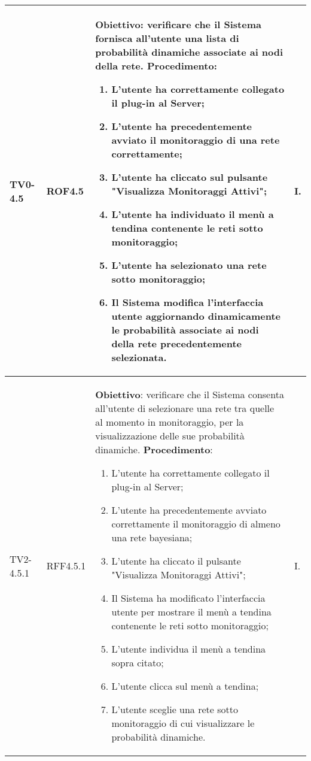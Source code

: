 \begin{longtable}{|C{.15\textwidth}|C{.13\textwidth}|m{.52\textwidth}|C{.08\textwidth}|}
TV0-4.5 & ROF4.5 &
	\textbf{Obiettivo}: verificare che il Sistema fornisca all'utente una lista di probabilità dinamiche associate ai nodi della rete. \newline
	\textbf{Procedimento}:
	\begin{enumerate}	
		\item L'utente ha correttamente collegato il plug-in al Server;
		\item L'utente ha precedentemente avviato il monitoraggio di una rete correttamente;
		\item L'utente ha cliccato sul pulsante "Visualizza Monitoraggi Attivi";
		\item L'utente ha individuato il menù a tendina contenente le reti sotto monitoraggio;
		\item L'utente ha selezionato una rete sotto monitoraggio;
		\item Il Sistema modifica l'interfaccia utente aggiornando dinamicamente le probabilità associate ai nodi della rete precedentemente selezionata.
	\end{enumerate}
	& I. \\
\hline

TV2-4.5.1 & RFF4.5.1 &
	\textbf{Obiettivo}: verificare che il Sistema consenta all'utente di selezionare una rete tra quelle al momento in monitoraggio, per la visualizzazione delle sue probabilità dinamiche. \newline
	\textbf{Procedimento}:
	\begin{enumerate}
		\item L'utente ha correttamente collegato il plug-in al Server;
		\item L'utente ha precedentemente avviato correttamente il monitoraggio di almeno una rete bayesiana;
		\item L'utente ha cliccato il pulsante "Visualizza Monitoraggi Attivi";
		\item Il Sistema ha modificato l'interfaccia utente per mostrare il menù a tendina contenente le reti sotto monitoraggio;
		\item L'utente individua il menù a tendina sopra citato;
		\item L'utente clicca sul menù a tendina;
		\item L'utente sceglie una rete sotto monitoraggio di cui visualizzare le probabilità dinamiche.
	\end{enumerate}
	& I. \\
\hline


\end{longtable}
